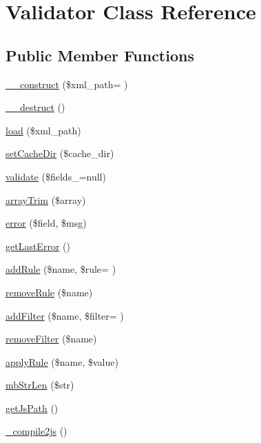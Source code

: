 \hypertarget{classValidator}{}\section{Validator Class Reference}
\label{classValidator}
\subsection*{Public Member Functions}
\begin{DoxyCompactItemize}
\item 
\hyperlink{classValidator_abfd7a6c58dc8cedae5bef76325b7bf6e}{\+\_\+\+\_\+construct} (\$xml\+\_\+path= \textquotesingle{}\textquotesingle{})
\item 
\hyperlink{classValidator_aa076d09e847e8461281d4912688a9388}{\+\_\+\+\_\+destruct} ()
\item 
\hyperlink{classValidator_a43de0eb69cae01eee855f825324ffc39}{load} (\$xml\+\_\+path)
\item 
\hyperlink{classValidator_a1630131530dca60428e72dd4dd2d4af3}{set\+Cache\+Dir} (\$cache\+\_\+dir)
\item 
\hyperlink{classValidator_a05e34dac507b8d719e7f95f2cd0220bc}{validate} (\$fields\+\_\+=null)
\item 
\hyperlink{classValidator_ac4be365554a620a921f6846e80d76671}{array\+Trim} (\$array)
\item 
\hyperlink{classValidator_ad46fa003b320d64ef656b22de870782c}{error} (\$field, \$msg)
\item 
\hyperlink{classValidator_a3de1a1112e46b42ab6a89a4a13048504}{get\+Last\+Error} ()
\item 
\hyperlink{classValidator_a71cc158b6b3f52f03e1ddb34f4801906}{add\+Rule} (\$name, \$rule= \textquotesingle{}\textquotesingle{})
\item 
\hyperlink{classValidator_acc2d2fd527f54e1fed839a927a83c6b8}{remove\+Rule} (\$name)
\item 
\hyperlink{classValidator_a5f22a8ddf58df13376769ed422492e33}{add\+Filter} (\$name, \$filter= \textquotesingle{}\textquotesingle{})
\item 
\hyperlink{classValidator_a7613a0d6b468b5d5ade046a801b260db}{remove\+Filter} (\$name)
\item 
\hyperlink{classValidator_a8a8be8c74216e9d0ebbd99eb1e29b8d2}{apply\+Rule} (\$name, \$value)
\item 
\hyperlink{classValidator_a46de77869676b1b027a076c2106653e2}{mb\+Str\+Len} (\$str)
\item 
\hyperlink{classValidator_ae9037d1911390583a1358b25c03768e3}{get\+Js\+Path} ()
\item 
\hyperlink{classValidator_ae7b44a7a2bfb3ee4672b4cf2cdbd059f}{\+\_\+compile2js} ()
\end{DoxyCompactItemize}

